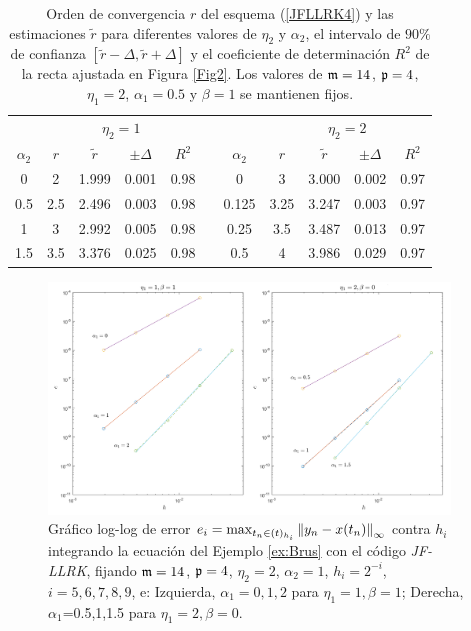 \begin{table}[htb]
	\centering
	\caption{
		Orden de convergencia $r$ del esquema (\ref{JFLLRK4}) y las estimaciones $\widetilde{r}$ para diferentes valores de $\eta_2$ y $\alpha_2$, el intervalo de $90\%$ de confianza $[\widetilde{r}-\varDelta,\widetilde{r}+\varDelta]$ y el coeficiente de determinación $R^2$ de la recta ajustada en Figura \ref{Fig2}. Los valores de $\mathfrak{m}=14$, $\mathfrak{p}=4$, $\eta_1=2$, $\alpha_1=0.5$ y $\beta=1$ se mantienen fijos. }
	\begin{adjustbox}{width=0.8\columnwidth,center}
		\begin{tabular}{ c  c c c c  c  c c c c c}
			\hline
			& \multicolumn{4}{c}{$\eta_2=1$} & & & \multicolumn{4}{c}{$\eta_2=2$} \\
			\cline{2-5} \cline{8-11}
			$\alpha_2$ & $r$ & $\widetilde{r}$ & $\pm\varDelta$ & $R^2$ & & $\alpha_2$ & $r$ & $\widetilde{r}$ & $\pm\varDelta$ & $R^2$ \\
			\hline
			0 & 2 & 1.999 & 0.001 & 0.98 & & 0 & 3 & 3.000 & 0.002 & 0.97 \\
			0.5 & 2.5 & 2.496 & 0.003 & 0.98 & & 0.125 & 3.25 & 3.247 & 0.003 & 0.97 \\
			1 & 3 & 2.992 & 0.005 & 0.98 & & 0.25 & 3.5 & 3.487 & 0.013 & 0.97 \\
			1.5 & 3.5 & 3.376 & 0.025 & 0.98 & & 0.5 & 4 & 3.986 & 0.029 & 0.97 \\
			\hline
		\end{tabular}
	\end{adjustbox}
	\label{tab:out}
\end{table}




\begin{figure}[htb]
	\centering
	\includegraphics[width=0.95\textwidth]{Graphics/lldp-fj/in_new.png}
	\caption{Gráfico log-log de error $e_i=\max_{t_n\in(t)_{h_i}}\left\lVert y_n-x(t_n) \right\rVert_\infty$ contra $h_i$ integrando la ecuación del Ejemplo \ref{ex:Brus} con el código \textit{JF-LLRK}, fijando $\mathfrak{m}=14$, $\mathfrak{p}=4$, $\eta_2=2$, $\alpha_2=1$, $h_i=2^{-i}$, $i=5,6,7,8,9$, e: Izquierda, $\alpha_1=0,1,2$ para $\eta_1=1,\beta=1$; Derecha, $\alpha_1$=0.5,1,1.5 para $\eta_1=2,\beta=0$.}
	\label{Fig3}
\end{figure}


